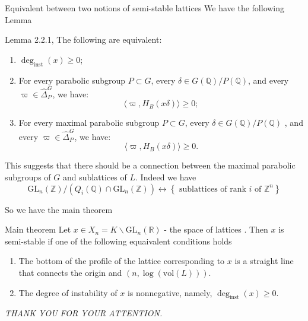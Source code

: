 \documentclass[pdf]{beamer}
\begin{document}
\begin{frame}{Equivalent between two notions of semi-stable lattices}
    We have the following Lemma
    \begin{block}{Lemma 2.2.1, \cite{chaudouard2016variante}}
        The following are equivalent:
        \begin{enumerate}
            \item \(\deg_{\text{inst}}(x) \geq 0\);
            \item For every parabolic subgroup \( P \subset G \), every \( \delta \in G(\mathbb{Q})/P(\mathbb{Q})\), and every \( \varpi \in \hat{\Delta}_P^G \), we have:
                  \[
                      \langle \varpi, H_B(x\delta ) \rangle \geq 0;
                  \]
            \item For every maximal parabolic subgroup \( P \subset G \), every \( \delta \in  G(\mathbb{Q})/P(\mathbb{Q})\) , and every \( \varpi \in \hat{\Delta}_P^G \), we have:
                  \[
                      \langle \varpi, H_B(x\delta ) \rangle \geq 0.
                  \]
        \end{enumerate}
    \end{block}
\end{frame}


\begin{frame}
    This suggests that there should be a connection between the maximal parabolic subgroups of $G$
    and sublattices of $L$. Indeed we have
    \[ \text{GL}_n(\mathbb{Z})/(Q_i(\mathbb{Q}) \cap \text{GL}_n(\mathbb{Z})) \longleftrightarrow \left\lbrace \text{ sublattices of rank $i$ of $\mathbb{Z}^n$}\right\rbrace\]

    So we have the main theorem
    \begin{block}{Main theorem}
        Let $x \in X_n = K \backslash \text{GL}_n(\mathbb{R})$ - the space of lattices . Then $x$ is semi-stable if one of the following equaivalent
        conditions holds
        \begin{enumerate}
            \item The bottom of the profile of the lattice corresponding to $x$ is a straight line that connects the origin and $(n,\log(\text{vol}(L)))$.
            \item The degree of instability of $x$ is nonnegative, namely, $\deg_{\text{inst}}(x) \ge 0$.
        \end{enumerate}
    \end{block}

\end{frame}


\begin{frame}
    \begin{center}
        \textit{THANK YOU FOR YOUR ATTENTION.}
    \end{center}
\end{frame}
\end{document}
